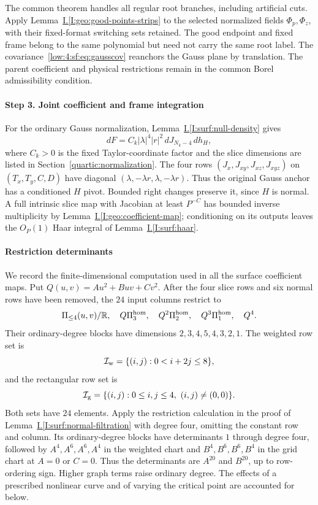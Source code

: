\documentclass[11pt]{amsart}
\theoremstyle{definition}
\theoremstyle{remark}
\numberwithin{equation}{section}
\newcommand{\partIref}[1]{\hyperref[I:#1]{I.\ref*{I:#1}}}
\begin{document}
The common theorem handles all regular root branches, including artificial cuts. Apply Lemma~\partIref{geo:good-points-strips} to the selected normalized fields $\Phi_p,\Phi_z$, with their fixed-format switching sets retained. The good endpoint and fixed frame belong to the same polynomial but need not carry the same root label. The covariance~\eqref{low:4:sf:eq:gausscov} reanchors the Gauss plane by translation. The parent coefficient and physical restrictions remain in the common Borel admissibility condition.

\paragraph{Step 3. Joint coefficient and frame integration}
For the ordinary Gauss normalization, Lemma~\partIref{surf:null-density} gives
\[
dF=C_k|\lambda|^4|r|^2\,dJ_{N_k-4}\,dh_H,
\]
where $C_k>0$ is the fixed Taylor-coordinate factor and the slice dimensions are listed in Section~\ref{quartic:normalization}. The four rows $(J_x,J_{xy},J_{xz},J_{xyz})$ on $(T_x,T_y,C,D)$ have diagonal $(\lambda,-\lambda r,\lambda,-\lambda r)$. Thus the original Gauss anchor has a conditioned $H$ pivot. Bounded right changes preserve it, since $H$ is normal. A full intrinsic slice map with Jacobian at least $P^{-C}$ has bounded inverse multiplicity by Lemma~\partIref{geo:coefficient-map}; conditioning on its outputs leaves the $O_P(1)$ Haar integral of Lemma~\partIref{surf:haar}.
\paragraph{Restriction determinants}
We record the finite-dimensional computation used in all the surface coefficient maps. Put $Q(u,v)=Au^2+Buv+Cv^2$. After the four slice rows and six normal rows have been removed, the $24$ input columns restrict to
\[
 \Pi_{\le4}(u,v)/\mathbb R,\quad Q\Pi_3^{\rm hom},\quad Q^2\Pi_2^{\rm hom},\quad Q^3\Pi_1^{\rm hom},\quad Q^4.
\]
Their ordinary-degree blocks have dimensions $2,3,4,5,4,3,2,1$. The weighted row set is
\[
 \mathcal I_{\rm w}=\{(i,j):0<i+2j\le8\},
\]
and the rectangular row set is
\[
 \mathcal I_{\rm g}=\{(i,j):0\le i,j\le4,\ (i,j)\ne(0,0)\}.
\]
Both sets have $24$ elements. Apply the restriction calculation in the proof of Lemma~\partIref{surf:normal-filtration} with degree four, omitting the constant row and column. Its ordinary-degree blocks have determinants $1$ through degree four, followed by $A^4,A^6,A^6,A^4$ in the weighted chart and $B^4,B^6,B^6,B^4$ in the grid chart at $A=0$ or $C=0$. Thus the determinants are $A^{20}$ and $B^{20}$, up to row-ordering sign. Higher graph terms raise ordinary degree. The effects of a prescribed nonlinear curve and of varying the critical point are accounted for below.
\end{document}
